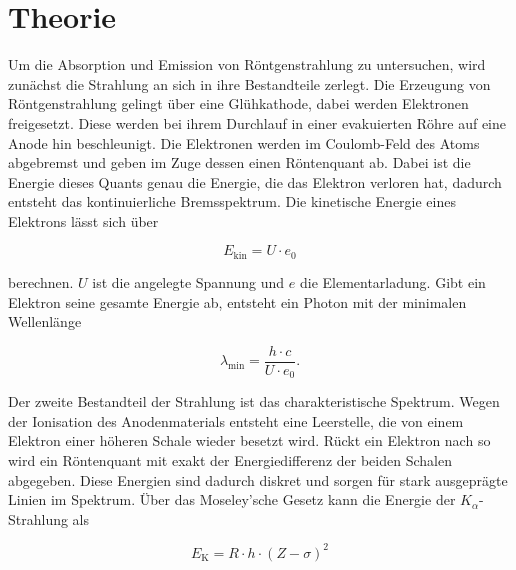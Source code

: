 \section{Theorie}
\label{sec:Theorie}




Um die Absorption und Emission von Röntgenstrahlung zu untersuchen, wird zunächst die Strahlung an sich in ihre Bestandteile zerlegt.
Die Erzeugung von Röntgenstrahlung gelingt über eine Glühkathode, dabei werden Elektronen freigesetzt.
Diese werden bei ihrem Durchlauf in einer evakuierten Röhre auf eine Anode hin beschleunigt.
Die Elektronen werden im Coulomb-Feld des Atoms abgebremst und geben im Zuge dessen einen Röntenquant ab.
Dabei ist die Energie dieses Quants genau die Energie, die das Elektron verloren hat, dadurch entsteht das kontinuierliche Bremsspektrum.
Die kinetische Energie eines Elektrons lässt sich über 

\begin{equation}
    E_\text{kin} = U \cdot e_0
    \label{eq:ekin}
\end{equation}

berechnen. $U$ ist die angelegte Spannung und $e$ die Elementarladung.
Gibt ein Elektron seine gesamte Energie ab, entsteht ein Photon mit der minimalen Wellenlänge 

\begin{equation}
    \lambda _\text{min} = \frac{h \cdot c}{U \cdot e_0}.
    \label{eq:lambdamin}
\end{equation}

Der zweite Bestandteil der Strahlung ist das charakteristische Spektrum.
Wegen der Ionisation des Anodenmaterials entsteht eine Leerstelle, die von einem Elektron einer höheren Schale wieder besetzt wird.
Rückt ein Elektron nach so wird ein Röntenquant mit exakt der Energiedifferenz der beiden Schalen abgegeben.
Diese Energien sind dadurch diskret und sorgen für stark ausgeprägte Linien im Spektrum.
Über das Moseley'sche Gesetz kann die Energie der $K_\alpha$-Strahlung als 

\begin{equation}
    E_\text{K} = R \cdot h \cdot \left(Z - \sigma\right)^2
    \label{eq:moseley}
\end{equation}

